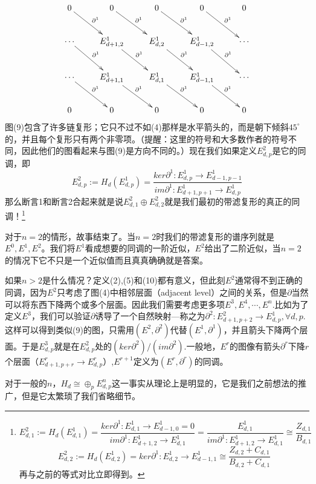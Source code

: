 \documentclass[a4paper,11pt,openany]{ctexart}
\begin{document}
 \begin{equation}
   \xymatrix{
  0\ar@{->}[dr]^{\partial^1} & 0\ar@{->}[dr]^{\partial^1} & 0\ar@{->}[dr]^{\partial^1} & 0\ar@{->}[dr]^{\partial^1} & 0 \\
  \cdots \ar@{->}[dr]^{\partial^1} & E_{d+1,2}^1\ar@{->}[dr]^{\partial^1} &E_{d,2}^1\ar@{->}[dr]^{\partial^1}&E_{d-1,2}^1\ar@{->}[dr]^{\partial^1}&\cdots \\
   \cdots \ar@{->}[dr]^{\partial^1} & E_{d+1,1}^1\ar@{->}[dr]^{\partial^1} &E_{d,1}^1\ar@{->}[dr]^{\partial^1}&E_{d-1,1}^1\ar@{->}[dr]^{\partial^1}&\cdots \\
   0&0&0&0&0
  }
 \end{equation}
图(9)包含了许多链复形；它只不过不如(4)那样是水平箭头的，而是朝下倾斜$45^\circ$的，并且每个复形只有两个非零项。（提醒：这里的符号和大多数作者的符号不同，因此他们的图看起来与图(9)是方向不同的。）现在我们如果定义$E_{d,p}^2$是它的同调，即
\begin{equation}
  E_{d,p}^2:=H_d(E^1_{d,p})=\frac{ker \partial^1:E^1_{d,p}\to E_{d-1,p-1}^1}{im \partial^1:E^1_{d+1,p+1}\to E_{d,p}^1}
\end{equation}
{\color{red}那么断言1和断言2合起来就是说$E_{d,1}^2\oplus E_{d,2}^2$就是我们最初的带滤复形的真正的同调！}\footnote{\[E_{d,1}^2:=H_d(E^1_{d,1})=\frac{ker \partial^1:E^1_{d,1}\to E_{d-1,0}^1=0}{im \partial^1:E^1_{d+1,2}\to E_{d,1}^1}=\frac{E^1_{d,1}}{im \partial^1:E^1_{d+1,2}\to E_{d,1}^1}\cong \frac{Z_{d,1}}{B_{d,1}}\]
\[E_{d,2}^2:=H_d(E^1_{d,2})=ker \partial^1:E^1_{d,2}\to E_{d-1,1}^1\cong \frac{Z_{d,2}+C_{d,1}}{B_{d,2}+C_{d,1}}\]
再与之前的等式对比立即得到。}

对于$n=2$的情形，故事结束了。当$n=2$时我们的带滤复形的谱序列就是$E^0,E^1,E^2$。我们将$E^1$看成想要的同调的一阶近似，$E^2$给出了二阶近似，当$n=2$的情况下它不只是一个近似值而且真真确确就是答案。

如果$n>2$是什么情况？定义(2),(5)和(10)都有意义，但此刻$E^2$通常得不到正确的同调，因为$E^2$只考虑了图(4)中相邻层面（adjacent level）之间的关系，但是$\partial$当然可以将东西下降两个或多个层面。因此我们需要考虑更多项$E^3,E^4,\cdots,E^n.$比如为了定义$E^3$，我们可以验证$\partial$诱导了一个自然映射---称之为$\partial^2:E^2_{d+1,p+2}\to E_{d,p}^1,\forall d,p$.这样可以得到类似(9)的图，只需用$(E^2,\partial^2)$代替$(E^1,\partial^1)$，并且箭头下降两个层面。于是$E^3_{d,p}$就是在$E^2_{d,p}$处的$(ker \partial^2)/(im\partial^2)$.一般地，$E^r$的图像有箭头$\partial^r$下降$r$个层面（$E^r_{d+1,p+r}\to E^r_{d,p}$）,$E^{r+1}$定义为$(E^r,\partial^r)$的同调。

对于一般的$n$，$H_d \cong \oplus_p E^n_{d,p}$这一事实从理论上是明显的，它是我们之前想法的推广，但是它太繁琐了我们省略细节。
\end{document}

